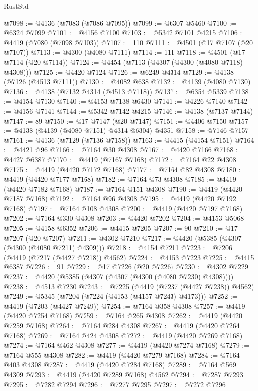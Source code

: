 \begin{lexlean}{RustStd}
\begin{coremodule}
@7098 := @4136 (@7083 (@7086 @7095))
@7099 := @6307 @5460
@7100 := @6324 @7099
@7101 := @4156 @7100
@7103 := @5342 @7101 @4215
@7106 := @4419 (@7080 (@7098 @7103))
@7107 := 110
@7111 := @4501 (@17 @7107 (@20 @7107))
@7113 := @4300 (@4080 @7111)
@7114 := 111
@7118 := @4501 (@17 @7114 (@20 @7114))
@7124 := @4454 (@7113 (@4307 (@4300 (@4080 @7118) @4308)))
@7125 := @4420 @7124
@7126 := @6249 @4314
@7129 := @4138 (@7126 (@4513 @7111))
@7130 := @4082 @638
@7132 := @4139 (@4080 @7130)
@7136 := @4138 (@7132 @4314 (@4513 @7118))
@7137 := @6354 @5339
@7138 := @4154 @7130
@7140 := @4153 @7138 @6430
@7141 := @4226 @7140
@7142 := @4156 @7141
@7144 := @5342 @7142 @4215
@7146 := @4138 (@7137 @7144)
@7147 := 89
@7150 := @17 @7147 (@20 @7147)
@7151 := @4406 @7150
@7157 := @4138 (@4139 (@4080 @7151) @4314 @6304) @4351
@7158 := @7146 @7157
@7161 := @4136 (@7129 (@7136 @7158))
@7163 := @4415 (@4154 @7151)
@7164 := @4421 @96
@7166 := @7164 @30 @4308
@7167 := @4420 @7166
@7168 := @4427 @6387
@7170 := @4419 (@7167 @7168)
@7172 := @7164 @22 @4308
@7175 := @4419 (@4420 @7172 @7168)
@7177 := @7164 @82 @4308
@7180 := @4419 (@4420 @7177 @7168)
@7182 := @7164 @73 @4308
@7185 := @4419 (@4420 @7182 @7168)
@7187 := @7164 @151 @4308
@7190 := @4419 (@4420 @7187 @7168)
@7192 := @7164 @96 @4308
@7195 := @4419 (@4420 @7192 @7168)
@7197 := @7164 @108 @4308
@7200 := @4419 (@4420 @7197 @7168)
@7202 := @7164 @330 @4308
@7203 := @4420 @7202
@7204 := @4153 @5068
@7205 := @4158 @6352
@7206 := @4415 @7205
@7207 := 90
@7210 := @17 @7207 (@20 @7207)
@7211 := @4302 @7210
@7217 := @4420 (@5385 (@4307 (@4300 (@4080 @7211) @4309)))
@7218 := @4154 @7211
@7223 := @7206 (@4419 (@7217 (@4427 @7218)) @4562)
@7224 := @4153 @7223
@7225 := @4415 @6387
@7226 := 91
@7229 := @17 @7226 (@20 @7226)
@7230 := @4302 @7229
@7237 := @4420 (@5385 (@4307 (@4307 (@4300 (@4080 @7230) @4308))))
@7238 := @4513 @7230
@7243 := @7225 (@4419 (@7237 (@4427 @7238)) @4562)
@7249 := @5345 (@7204 (@7224 (@4153 (@4157 @7243) @4173)))
@7252 := @4419 (@7203 (@4427 @7249))
@7254 := @7164 @358 @4308
@7257 := @4419 (@4420 @7254 @7168)
@7259 := @7164 @265 @4308
@7262 := @4419 (@4420 @7259 @7168)
@7264 := @7164 @284 @4308
@7267 := @4419 (@4420 @7264 @7168)
@7269 := @7164 @424 @4308
@7272 := @4419 (@4420 @7269 @7168)
@7274 := @7164 @462 @4308
@7277 := @4419 (@4420 @7274 @7168)
@7279 := @7164 @555 @4308
@7282 := @4419 (@4420 @7279 @7168)
@7284 := @7164 @403 @4308
@7287 := @4419 (@4420 @7284 @7168)
@7289 := @7164 @569 @4309
@7293 := @4419 (@4420 @7289 @7168) @4562
@7294 := @7287 @7293
@7295 := @7282 @7294
@7296 := @7277 @7295
@7297 := @7272 @7296

\end{coremodule}
\end{lexlean}
